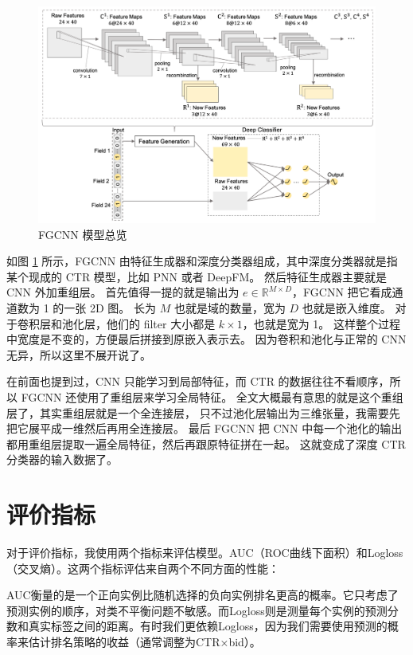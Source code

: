 \documentclass[degree=project,degree-type=project,cjk-font=noto]{thuthesis}
\begin{document}
\begin{figure}[h]
\centering%
\includegraphics[width=.95\linewidth]{FGCNN}
  \caption{FGCNN 模型总览}
  \label{fig:fgcnn}
\end{figure}

如图 \ref{fig:fgcnn} 所示，FGCNN 由特征生成器和深度分类器组成，其中深度分类器就是指某个现成的 CTR 模型，比如 PNN 或者 DeepFM。
然后特征生成器主要就是 CNN 外加重组层。
首先值得一提的就是输出为 $e \in \mathbb{R}^{M \times D}$，FGCNN 把它看成通道数为 1 的一张 2D 图。
长为 $M$ 也就是域的数量，宽为 $D$ 也就是嵌入维度。
对于卷积层和池化层，他们的 filter 大小都是 $k \times 1$，也就是宽为 1。
这样整个过程中宽度是不变的，方便最后拼接到原嵌入表示去。
因为卷积和池化与正常的 CNN 无异，所以这里不展开说了。

在前面也提到过，CNN 只能学习到局部特征，而 CTR 的数据往往不看顺序，所以 FGCNN 还使用了重组层来学习全局特征。
全文大概最有意思的就是这个重组层了，其实重组层就是一个全连接层，
只不过池化层输出为三维张量，我需要先把它展平成一维然后再用全连接层。
最后 FGCNN 把 CNN 中每一个池化的输出都用重组层提取一遍全局特征，然后再跟原特征拼在一起。
这就变成了深度 CTR 分类器的输入数据了。

\chapter{评价指标}
\label{chap:metrics}

对于评价指标，我使用两个指标来评估模型。AUC（ROC曲线下面积）和Logloss（交叉熵）。这两个指标评估来自两个不同方面的性能：

AUC衡量的是一个正向实例比随机选择的负向实例排名更高的概率。它只考虑了预测实例的顺序，对类不平衡问题不敏感。而Logloss则是测量每个实例的预测分数和真实标签之间的距离。有时我们更依赖Logloss，因为我们需要使用预测的概率来估计排名策略的收益（通常调整为CTR×bid）。
\end{document}
